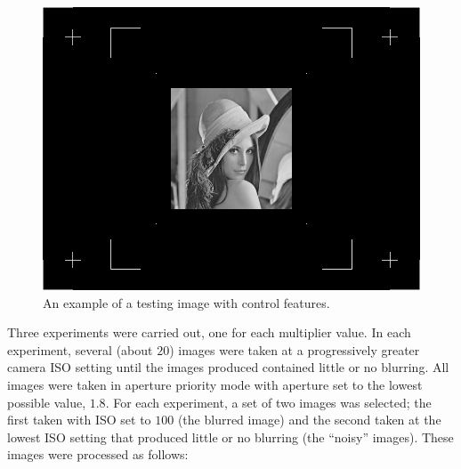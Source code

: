 \documentclass[12pt,notitlepage]{report}
\begin{document}
\begin{figure}[htb]
 \centering
  \includegraphics[width=12cm]{testing_image_control_points.png}
 \caption{An example of a testing image with control features.}
 \label{fig:testing_image_control_points}
\end{figure}

Three experiments were carried out, one for each multiplier value. In each experiment, several (about $20$) images were taken at a progressively greater camera ISO setting until the images produced contained little or no blurring. All images were taken in aperture priority mode with aperture set to the lowest possible value, $1.8$. For each experiment, a set of two images was selected; the first taken with ISO set to $100$ (the blurred image) and the second taken at the lowest ISO setting that produced little or no blurring (the ``noisy'' images). These images were processed as follows: 
\end{document}
